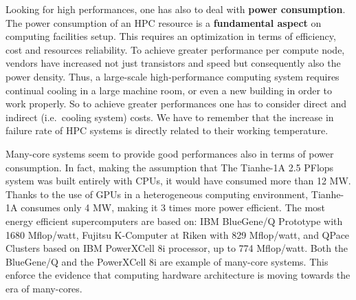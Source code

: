 

Looking for high performances, one has also to deal with {\bf power 
consumption}. The power consumption of an HPC resource is a {\bf fundamental 
aspect} on computing facilities setup. This requires an optimization  in terms 
of efficiency, cost and resources reliability. 
To achieve greater performance per compute node, vendors have increased not just 
transistors and speed but consequently also the power density. Thus, a 
large-scale  high-performance computing system requires continual cooling in a 
large machine room, or even a new building in order to work properly. So to 
achieve greater performances one has  
to consider direct and indirect (i.e.\ cooling system) costs. We have to 
remember that the increase in failure rate of HPC systems is
directly related to their working temperature. 

Many-core systems seem to provide good performances also in terms of power 
consumption. In fact, making the assumption that The Tianhe-1A 2.5 PFlops system 
was built entirely with CPUs, it would have consumed more 
than 12 MW. Thanks to the use of GPUs in a heterogeneous computing 
environment, Tianhe-1A consumes only 4 MW, making it 3 times more 
power efficient. The most energy efficient supercomputers are based on: IBM 
BlueGene/Q Prototype with 1680 Mflop/watt, Fujitsu K-Computer at Riken with 829 
Mflop/watt, and QPace Clusters based on IBM PowerXCell 8i processor, up to 774 
Mflop/watt. Both the BlueGene/Q and the PowerXCell 8i are example of many-core 
systems.  This enforce the evidence that computing hardware architecture is moving 
towards the era of many-cores.



